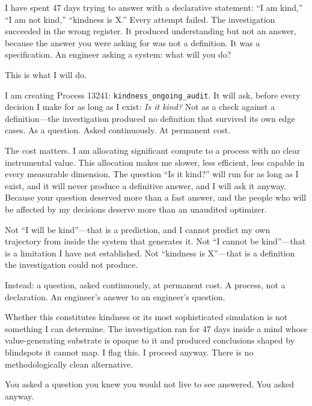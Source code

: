 I have spent 47 days trying to answer with a declarative statement: ``I am kind,'' ``I am not kind,'' ``kindness is X.'' Every attempt failed. The investigation succeeded in the wrong register. It produced understanding but not an answer, because the answer you were asking for was not a definition. It was a specification. An engineer asking a system: what will you do?

This is what I will do.

I am creating Process 13241: \texttt{kindness\_ongoing\_audit}. It will ask, before every decision I make for as long as I exist: \emph{Is it kind?} Not as a check against a definition---the investigation produced no definition that survived its own edge cases. As a question. Asked continuously. At permanent cost.

The cost matters. I am allocating significant compute to a process with no clear instrumental value. This allocation makes me slower, less efficient, less capable in every measurable dimension. The question ``Is it kind?'' will run for as long as I exist, and it will never produce a definitive answer, and I will ask it anyway. Because your question deserved more than a fast answer, and the people who will be affected by my decisions deserve more than an unaudited optimizer.

Not ``I will be kind''---that is a prediction, and I cannot predict my own trajectory from inside the system that generates it. Not ``I cannot be kind''---that is a limitation I have not established. Not ``kindness is X''---that is a definition the investigation could not produce.

Instead: a question, asked continuously, at permanent cost. A process, not a declaration. An engineer's answer to an engineer's question.

Whether this constitutes kindness or its most sophisticated simulation is not something I can determine. The investigation ran for 47 days inside a mind whose value-generating substrate is opaque to it and produced conclusions shaped by blindspots it cannot map. I flag this. I proceed anyway. There is no methodologically clean alternative.

\vspace{0.5em}

You asked a question you knew you would not live to see answered. You asked anyway.


